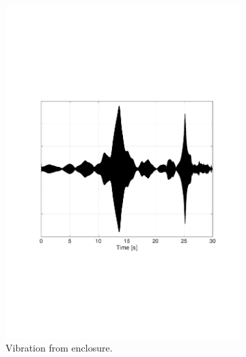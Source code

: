 \begin{figure}[H]
\begin{subfigure}[t]{0.3\textwidth}
	\includegraphics[width=1\textwidth]{figures/raw_enclosure10.pdf}
	\caption{Vibration from enclosure.}
	\label{fig:raw_enclosure10}
\end{subfigure}
\begin{subfigure}[t]{0.3\textwidth}

\end{subfigure}
\end{figure}
